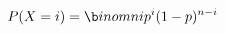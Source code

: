 \documentclass[preview]{standalone}
\begin{document}
\begin{align*}
P(X =  i )=\b i n om{ n }{ i }  p ^{ i }(1- p )^{ n - i }
\end{align*}
\end{document}

